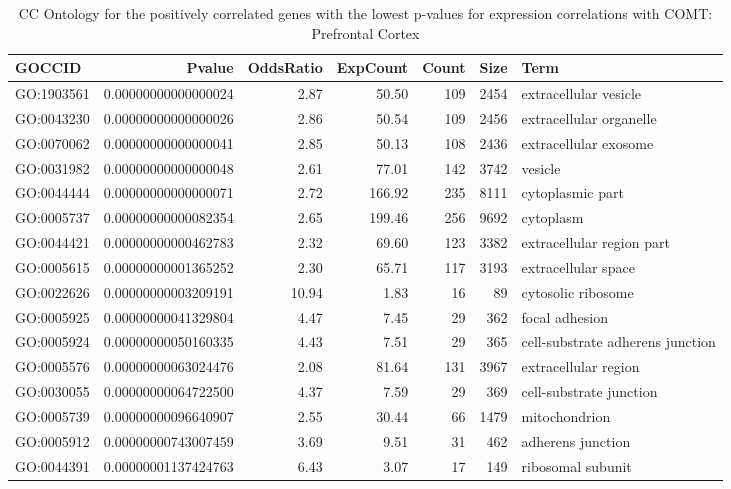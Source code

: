 \documentclass[letterpaper,12pt]{article}
\numberwithin{equation}{appendix}
\begin{document}
\noindent

\begin{landscape}

{\footnotesize {
\setlength\LTleft{-1cm}
\setlength\LTright{-1cm}
\begin{longtable}{lrrrrrl}
\caption{CC Ontology for the positively correlated genes with the lowest p-values for expression correlations with COMT: Prefrontal Cortex} \\ 
  \toprule
GOCCID & Pvalue & OddsRatio & ExpCount & Count & Size & Term \\ 
  \midrule
GO:1903561 & 0.00000000000000024 & 2.87 & 50.50 & 109 & 2454 & extracellular vesicle \\ 
  GO:0043230 & 0.00000000000000026 & 2.86 & 50.54 & 109 & 2456 & extracellular organelle \\ 
  GO:0070062 & 0.00000000000000041 & 2.85 & 50.13 & 108 & 2436 & extracellular exosome \\ 
  GO:0031982 & 0.00000000000000048 & 2.61 & 77.01 & 142 & 3742 & vesicle \\ 
  GO:0044444 & 0.00000000000000071 & 2.72 & 166.92 & 235 & 8111 & cytoplasmic part \\ 
  GO:0005737 & 0.00000000000082354 & 2.65 & 199.46 & 256 & 9692 & cytoplasm \\ 
  GO:0044421 & 0.00000000000462783 & 2.32 & 69.60 & 123 & 3382 & extracellular region part \\ 
  GO:0005615 & 0.00000000001365252 & 2.30 & 65.71 & 117 & 3193 & extracellular space \\ 
  GO:0022626 & 0.00000000003209191 & 10.94 & 1.83 & 16 & 89 & cytosolic ribosome \\ 
  GO:0005925 & 0.00000000041329804 & 4.47 & 7.45 & 29 & 362 & focal adhesion \\ 
  GO:0005924 & 0.00000000050160335 & 4.43 & 7.51 & 29 & 365 & cell-substrate adherens junction \\ 
  GO:0005576 & 0.00000000063024476 & 2.08 & 81.64 & 131 & 3967 & extracellular region \\ 
  GO:0030055 & 0.00000000064722500 & 4.37 & 7.59 & 29 & 369 & cell-substrate junction \\ 
  GO:0005739 & 0.00000000096640907 & 2.55 & 30.44 & 66 & 1479 & mitochondrion \\ 
  GO:0005912 & 0.00000000743007459 & 3.69 & 9.51 & 31 & 462 & adherens junction \\ 
  GO:0044391 & 0.00000001137424763 & 6.43 & 3.07 & 17 & 149 & ribosomal subunit \\ 

\end{longtable}}}
\end{landscape}
\end{document}
